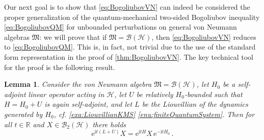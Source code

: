 \documentclass[a4paper, twoside, 11pt, reqno]{amsart}
\theoremstyle{definition}
\theoremstyle{plain}
\newtheorem{lemma}[definition]{Lemma}
\newcommand{\R}{\mathbb{R}}
\newcommand{\MH}{\mathcal{H}}
\newcommand{\MFM}{\mathfrak{M}}
\newcommand{\ii}{\mathrm{i}}
\newcommand{\ee}{\mathrm{e}}
\newcommand{\BO}{\mathscr{B}}
\newcommand{\HS}{\BO_2}
\newcommand{\1}{\mathbf{1}}
\begin{document}
Our next goal is to show that \cref{eq:BogoliubovVN} can indeed be considered the proper generalization of the quantum-mechanical two-sided Bogoliubov inequality \eqref{eq:BogoliubovQM} for unbounded perturbations on general von Neumann algebras $\MFM$: we will prove that if $\MFM = \BO(\MH)$, then \eqref{eq:BogoliubovVN} reduces to \eqref{eq:BogoliubovQM}. This is, in fact, not trivial due to the use of the standard form representation in the proof of \cref{thm:BogoliubovVN}. The key technical tool for the proof is the following result.

\begin{lemma}\label{lem:perturbedLiouvillianFQS}
    Consider the von Neumann algebra $\MFM = \BO(\MH)$, let $H_0$ be a self-adjoint linear operator acting in $\MH$, let $U$ be relatively $H_0$-bounded such that $H = H_0 + U$ is again self-adjoint, and let $L$ be the Liouvillian of the dynamics generated by $H_0$, cf. \cref{exa:LiouvillianKMS} \ref{enu:finiteQuantumSystem}. Then for all $t \in \R$ and $X \in \HS(\MH)$ there holds
    \begin{equation}\label{eq:perturbedLiouvillianFQS}
        \ee^{\ii t (L + U)} X = \ee^{\ii t H} X \, \ee^{- \ii t H_0} \, .
    \end{equation}
\end{lemma}
\end{document}
